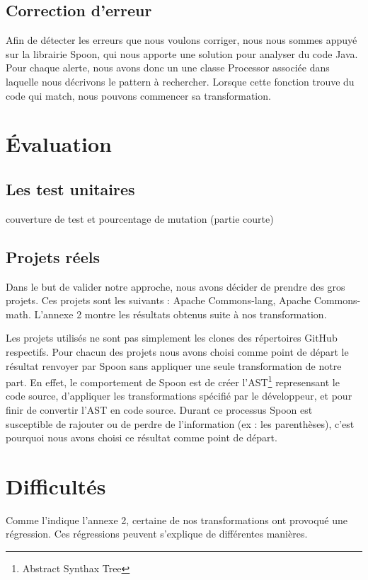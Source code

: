 \documentclass[a4paper]{article}
\begin{document}
\subsection{Correction d'erreur}
\par Afin de détecter les erreurs que nous voulons corriger, nous nous sommes appuyé sur la librairie Spoon, qui nous apporte une solution pour analyser du code Java. Pour chaque alerte, nous avons donc un une classe Processor associée dans laquelle nous décrivons le pattern à rechercher. Lorsque cette fonction trouve du code qui match, nous pouvons commencer sa transformation.




\section{Évaluation}
\subsection{Les test unitaires}
couverture de test et pourcentage de mutation (partie courte)
\subsection{Projets réels}
\par Dans le but de valider notre approche, nous avons décider de prendre des gros projets. Ces projets sont les suivants : Apache Commons-lang, Apache Commons-math. L'annexe 2 montre les résultats obtenus suite à nos transformation.
\\
\par Les projets utilisés ne sont pas simplement les clones des répertoires GitHub respectifs. Pour chacun des projets nous avons choisi comme point de départ le résultat renvoyer par Spoon sans appliquer une seule transformation de notre part. En effet, le comportement de Spoon est de créer l'AST\footnote{Abstract Synthax Tree} represensant le code source, d'appliquer les transformations spécifié par le développeur, et pour finir de convertir l'AST en code source. Durant ce processus Spoon est susceptible de rajouter ou de perdre de l'information (ex : les parenthèses), c'est pourquoi nous avons choisi ce résultat comme point de départ.


\section{Difficultés}
\par Comme l'indique l'annexe 2, certaine de nos transformations ont provoqué une régression. Ces régressions peuvent s'explique de différentes manières.
\end{document}

